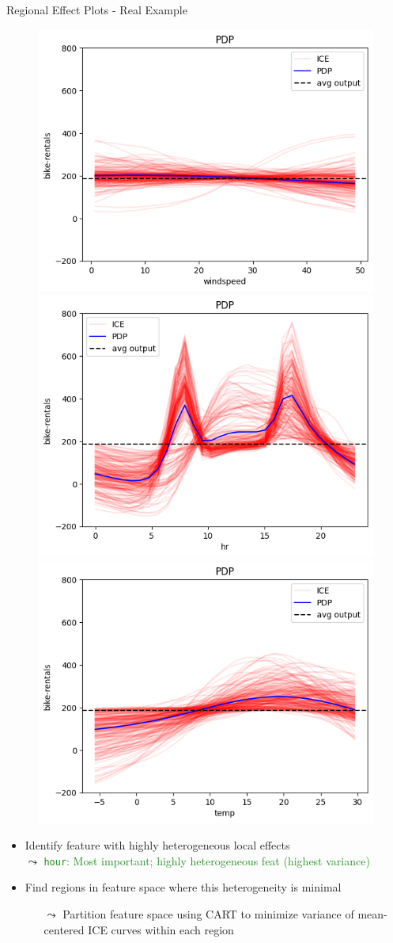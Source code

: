 \documentclass[10pt,compress,t,notes=noshow, xcolor=table]{beamer}
\begin{document}
\begin{frame}{Regional Effect Plots - Real Example}
\begin{figure}
    \centering
    \includegraphics[width=0.325\linewidth]{figure/01_bike_sharing_dataset_18_4.png}
    \includegraphics[width=0.325\linewidth]{figure/01_bike_sharing_dataset_18_1.png}
    \includegraphics[width=0.325\linewidth]{figure/01_bike_sharing_dataset_18_2.png}%
\end{figure}
\begin{itemize}
\item Identify feature with highly heterogeneous local effects\\
$\leadsto$ \textcolor{ForestGreen}{\texttt{hour}: Most important; highly heterogeneous feat (highest variance)}
\item Find regions in feature space where this heterogeneity is minimal
\begin{itemize}
    \item[$\leadsto$] Partition feature space using CART to minimize variance of mean-centered ICE curves within each region
\end{itemize}
\end{itemize}
\end{frame}
\end{document}
